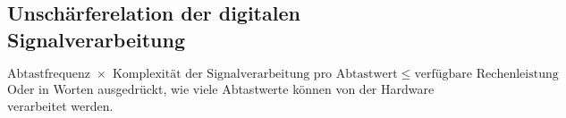 	\subsection{Unschärferelation der digitalen Signalverarbeitung}
	\begin{equation}
		\text{Abtastfrequenz } \times\text{ Komplexität der Signalverarbeitung pro Abtastwert} \leq \text{verfügbare Rechenleistung}
	\end{equation}
	Oder in Worten ausgedrückt, wie viele Abtastwerte können von der Hardware verarbeitet werden.